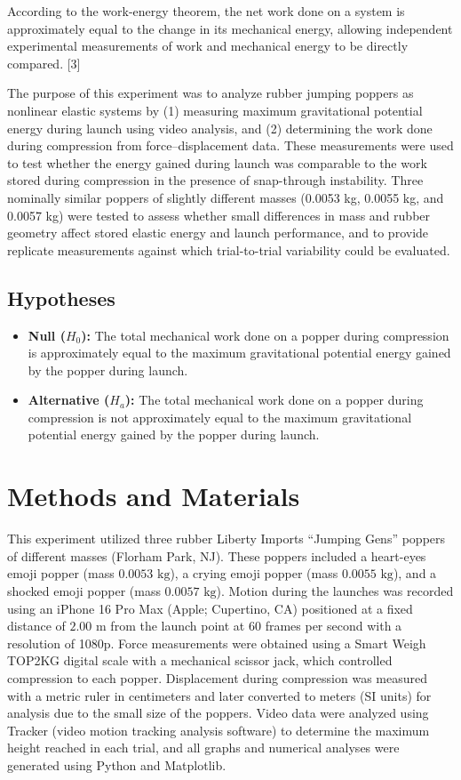 \documentclass[12pt]{article}
\begin{document}
According to the work-energy theorem, the net work done on a system is approximately equal to the change in its mechanical energy, allowing independent experimental measurements of work and mechanical energy to be directly compared. [3]

The purpose of this experiment was to analyze rubber jumping poppers as nonlinear elastic systems by (1) measuring maximum gravitational potential energy during launch using video analysis, and (2) determining the work done during compression from force--displacement data. These measurements were used to test whether the energy gained during launch was comparable to the work stored during compression in the presence of snap-through instability. Three nominally similar poppers of slightly different masses (0.0053 kg, 0.0055 kg, and 0.0057 kg) were tested to assess whether small differences in mass and rubber geometry affect stored elastic energy and launch performance, and to provide replicate measurements against which trial-to-trial variability could be evaluated.

\subsection*{Hypotheses}
\begin{itemize}
    \item \textbf{Null ($H_0$):} The total mechanical work done on a popper during compression is approximately equal to the maximum gravitational potential energy gained by the popper during launch.
    \item \textbf{Alternative ($H_a$):} The total mechanical work done on a popper during compression is not approximately equal to the maximum gravitational potential energy gained by the popper during launch.
\end{itemize}

\section{Methods and Materials}
This experiment utilized three rubber Liberty Imports ``Jumping Gens'' poppers of different masses (Florham Park, NJ). These poppers included a heart-eyes emoji popper (mass $0.0053\text{ kg}$), a crying emoji popper (mass $0.0055\text{ kg}$), and a shocked emoji popper (mass $0.0057\text{ kg}$). Motion during the launches was recorded using an iPhone 16 Pro Max (Apple; Cupertino, CA) positioned at a fixed distance of $2.00\text{ m}$ from the launch point at 60 frames per second with a resolution of 1080p. Force measurements were obtained using a Smart Weigh TOP2KG digital scale with a mechanical scissor jack, which controlled compression to each popper. Displacement during compression was measured with a metric ruler in centimeters and later converted to meters (SI units) for analysis due to the small size of the poppers. Video data were analyzed using Tracker (video motion tracking analysis software) to determine the maximum height reached in each trial, and all graphs and numerical analyses were generated using Python and Matplotlib. 
\end{document}
